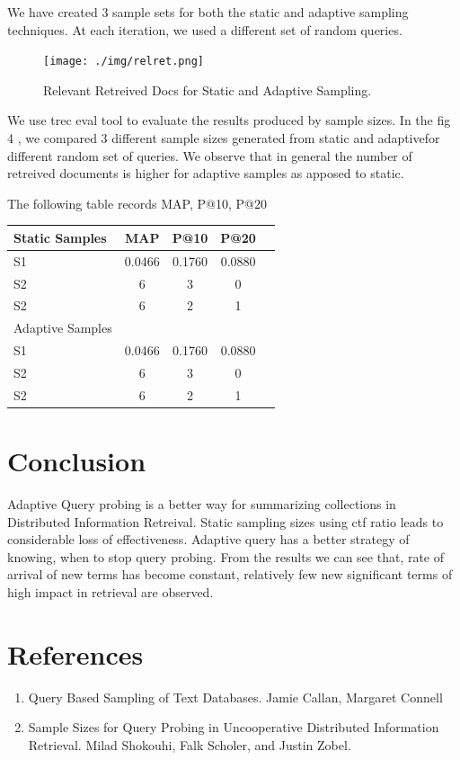 \documentclass[paper=a4, fontsize=11pt,twoside]{scrartcl}	%
\begin{document}
We have created 3 sample sets for both the static and adaptive sampling techniques. At each iteration, we used a different set of random queries.

\begin{figure}[H]
\centering
\texttt{[image: ./img/relret.png]}
\caption{\label{fig:4}Relevant Retreived Docs for Static and Adaptive Sampling.}
\end{figure}

We use trec eval tool to evaluate the results produced by sample sizes.
In the fig 4 , we compared 3 different sample sizes generated from static and adaptivefor different random set of queries. We observe that in general the number of retreived documents is higher for adaptive samples as apposed to static. 



The following table records MAP, P@10, P@20

\begin{tabular}{l*{3}{c}r}
Static Samples              & MAP & P@10 & P@20  \\
\hline
S1 & 0.0466 & 0.1760 & 0.0880 \\
S2 & 6 & 3 & 0   \\
S2 & 6 & 2 & 1   \\
\hline
Adaptive Samples \\
\hline
S1 & 0.0466 & 0.1760 & 0.0880 \\
S2 & 6 & 3 & 0   \\
S2 & 6 & 2 & 1   \\
\end{tabular}


\clearpage

\section{Conclusion}
Adaptive Query probing is a better way for summarizing collections in Distributed Information Retreival. Static sampling sizes using ctf ratio leads to considerable loss of effectiveness. Adaptive query has a better strategy of knowing, when to stop query probing. From the results we can see that, rate of arrival of new terms has
become constant, relatively few new significant terms of high impact in retrieval are observed.



\section{References}

\begin{enumerate}
  \item Query Based Sampling of Text Databases. Jamie Callan, Margaret Connell 
  \item Sample Sizes for Query Probing in Uncooperative Distributed Information Retrieval. Milad Shokouhi, 
  Falk Scholer, and Justin Zobel. 
\end{enumerate}

\end{document}

